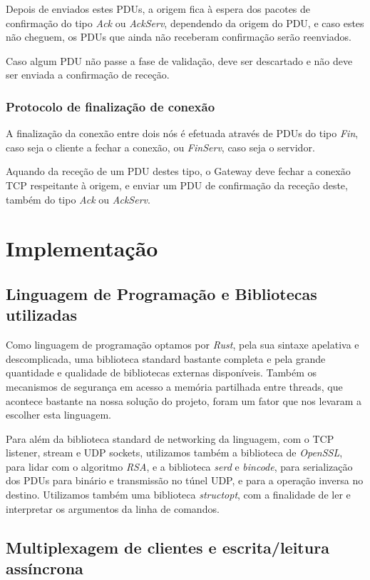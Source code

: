 \documentclass[a4paper]{report}
\begin{document}
Depois de enviados estes PDUs, a origem fica à espera dos pacotes de confirmação
do tipo \textit{Ack} ou \textit{AckServ}, dependendo da origem do PDU, e caso
estes não cheguem, os PDUs que ainda não receberam confirmação serão reenviados.

Caso algum PDU não passe a fase de validação, deve ser descartado e não deve
ser enviada a confirmação de receção.

\subsection{Protocolo de finalização de conexão}

A finalização da conexão entre dois nós é efetuada através de PDUs do tipo
\textit{Fin}, caso seja o cliente a fechar a conexão, ou \textit{FinServ},
caso seja o servidor.

Aquando da receção de um PDU destes tipo, o Gateway deve fechar a conexão TCP
respeitante à origem, e enviar um PDU de confirmação da receção deste, também
do tipo \textit{Ack} ou \textit{AckServ}.

\chapter{Implementação}

\section{Linguagem de Programação e Bibliotecas utilizadas}

Como linguagem de programação optamos por \textit{Rust}, pela sua sintaxe
apelativa e descomplicada, uma biblioteca standard bastante completa e pela
grande quantidade e qualidade de bibliotecas externas disponíveis. Também
os mecanismos de segurança em acesso a memória partilhada entre threads,
que acontece bastante na nossa solução do projeto, foram um fator que nos
levaram a escolher esta linguagem.

Para além da biblioteca standard de networking da linguagem, com o TCP
listener, stream e UDP sockets, utilizamos também a biblioteca de 
\textit{OpenSSL}, para lidar com o algoritmo \textit{RSA}, e a biblioteca
\textit{serd} e \textit{bincode}, para serialização dos PDUs para binário
e transmissão no túnel UDP, e para a operação inversa no destino. Utilizamos
também uma biblioteca \textit{structopt}, com a finalidade de ler e interpretar 
os argumentos da linha de comandos.

\section{Multiplexagem de clientes e escrita/leitura assíncrona}
\end{document}
